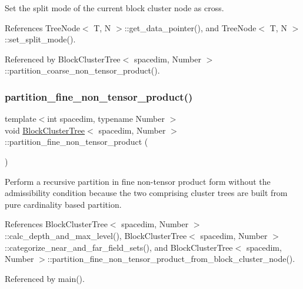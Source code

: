 Set the split mode of the current block cluster node as cross.

References Tree\+Node$<$ T, N $>$\+::get\+\_\+data\+\_\+pointer(), and Tree\+Node$<$ T, N $>$\+::set\+\_\+split\+\_\+mode().



Referenced by Block\+Cluster\+Tree$<$ spacedim, Number $>$\+::partition\+\_\+coarse\+\_\+non\+\_\+tensor\+\_\+product().

\mbox{\label{classBlockClusterTree_ac6d23af20c52c7b32eb080bd54556206}} 
\subsubsection{\texorpdfstring{partition\+\_\+fine\+\_\+non\+\_\+tensor\+\_\+product()}{partition\_fine\_non\_tensor\_product()}}
{\footnotesize\ttfamily template$<$int spacedim, typename Number $>$ \\
void \hyperlink{classBlockClusterTree}{Block\+Cluster\+Tree}$<$ spacedim, Number $>$\+::partition\+\_\+fine\+\_\+non\+\_\+tensor\+\_\+product (\begin{DoxyParamCaption}{ }\end{DoxyParamCaption})}

Perform a recursive partition in fine non-\/tensor product form without the admissibility condition because the two comprising cluster trees are built from pure cardinality based partition. 

References Block\+Cluster\+Tree$<$ spacedim, Number $>$\+::calc\+\_\+depth\+\_\+and\+\_\+max\+\_\+level(), Block\+Cluster\+Tree$<$ spacedim, Number $>$\+::categorize\+\_\+near\+\_\+and\+\_\+far\+\_\+field\+\_\+sets(), and Block\+Cluster\+Tree$<$ spacedim, Number $>$\+::partition\+\_\+fine\+\_\+non\+\_\+tensor\+\_\+product\+\_\+from\+\_\+block\+\_\+cluster\+\_\+node().



Referenced by main().

\mbox{\label{classBlockClusterTree_aa6354696477c8cae61d362b5ec707034}} 
